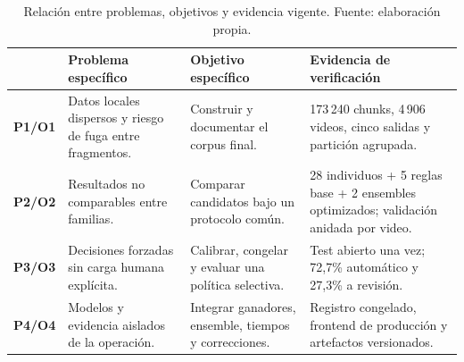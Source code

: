 \begin{table}[t]
\centering
\caption{Relación entre problemas, objetivos y evidencia vigente. Fuente: elaboración propia.}
\label{tab:problemas}
\small
\begin{tabularx}{\textwidth}{>{\bfseries}p{12mm}X X X}
\toprule
 & \textbf{Problema específico} & \textbf{Objetivo específico} & \textbf{Evidencia de verificación} \\
\midrule
P1/O1 & Datos locales dispersos y riesgo de fuga entre fragmentos. & Construir y documentar el corpus final. & 173\,240 chunks, 4\,906 videos, cinco salidas y partición agrupada. \\
P2/O2 & Resultados no comparables entre familias. & Comparar candidatos bajo un protocolo común. & 28 individuos + 5 reglas base + 2 ensembles optimizados; validación anidada por video. \\
P3/O3 & Decisiones forzadas sin carga humana explícita. & Calibrar, congelar y evaluar una política selectiva. & Test abierto una vez; 72,7\% automático y 27,3\% a revisión. \\
P4/O4 & Modelos y evidencia aislados de la operación. & Integrar ganadores, ensemble, tiempos y correcciones. & Registro congelado, frontend de producción y artefactos versionados. \\
\bottomrule
\end{tabularx}
\end{table}
